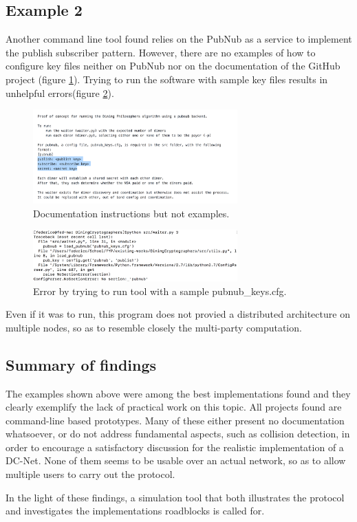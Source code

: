 \subsection{Example 2}
Another command line tool found relies on the PubNub as a service to implement the publish subscriber pattern. However, there are no examples of how to configure key files neither on PubNub nor on the documentation of the GitHub project (figure \ref{fig:work2documentation}). Trying to run the software with sample key files results in unhelpful errors(figure \ref{fig:work2error}). 

\begin{figure}[h!]
    \centering
    \includegraphics[width=0.7\textwidth]{Images/work2Documentation.png}
    \caption{Documentation instructions but not examples.}
    \label{fig:work2documentation}
\end{figure}

\begin{figure}[h!]
    \centering
    \includegraphics[width=0.7\textwidth]{Images/work2Error.png}
    \caption{Error by trying to run tool with a sample pubnub{\_}keys.cfg.}
    \label{fig:work2error}
\end{figure}

Even if it was to run, this program does not provied a distributed architecture on multiple nodes, so as to resemble closely the multi-party computation.


\subsection{Summary of findings}
The examples shown above were among the best implementations found and they clearly exemplify the lack of practical work on this topic. All projects found are command-line based prototypes. Many of these either present no documentation whatsoever, or do not address fundamental aspects, such as collision detection, in order to encourage a satisfactory discussion for the realistic implementation of a DC-Net. None of them seems to be usable over an actual network, so as to allow multiple users to carry out the protocol.

In the light of these findings, a simulation tool that both illustrates the protocol and investigates the implementations roadblocks is called for.

